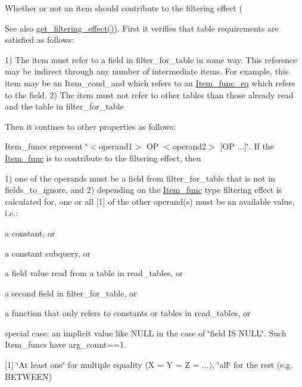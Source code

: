 Whether or not an item should contribute to the filtering effect (\begin{DoxySeeAlso}{See also}
\mbox{\hyperlink{classItem_a83f65da25aae04ad1aecebc1d43832c0}{get\+\_\+filtering\+\_\+effect()}}). First it verifies that table requirements are satisfied as follows\+:
\end{DoxySeeAlso}
1) The item must refer to a field in \textquotesingle{}filter\+\_\+for\+\_\+table\textquotesingle{} in some way. This reference may be indirect through any number of intermediate items. For example, this item may be an Item\+\_\+cond\+\_\+and which refers to an \mbox{\hyperlink{classItem__func__eq}{Item\+\_\+func\+\_\+eq}} which refers to the field. 2) The item must not refer to other tables than those already read and the table in \textquotesingle{}filter\+\_\+for\+\_\+table\textquotesingle{}

Then it contines to other properties as follows\+:

Item\+\_\+funcs represent \char`\"{}$<$operand1$>$ O\+P $<$operand2$>$ \mbox{[}\+O\+P ...\mbox{]}\char`\"{}. If the \mbox{\hyperlink{classItem__func}{Item\+\_\+func}} is to contribute to the filtering effect, then

1) one of the operands must be a field from \textquotesingle{}filter\+\_\+for\+\_\+table\textquotesingle{} that is not in \textquotesingle{}fields\+\_\+to\+\_\+ignore\textquotesingle{}, and 2) depending on the \mbox{\hyperlink{classItem__func}{Item\+\_\+func}} type filtering effect is calculated for, one or all \mbox{[}1\mbox{]} of the other operand(s) must be an available value, i.\+e.\+:
\begin{DoxyItemize}
\item a constant, or
\item a constant subquery, or
\item a field value read from a table in \textquotesingle{}read\+\_\+tables\textquotesingle{}, or
\item a second field in \textquotesingle{}filter\+\_\+for\+\_\+table\textquotesingle{}, or
\item a function that only refers to constants or tables in \textquotesingle{}read\+\_\+tables\textquotesingle{}, or
\item special case\+: an implicit value like N\+U\+LL in the case of \char`\"{}field I\+S N\+U\+L\+L\char`\"{}. Such Item\+\_\+funcs have arg\+\_\+count==1.
\end{DoxyItemize}

\mbox{[}1\mbox{]} \char`\"{}\+At least one\char`\"{} for multiple equality (X = Y = Z = ...), \char`\"{}all\char`\"{} for the rest (e.\+g. B\+E\+T\+W\+E\+EN)


